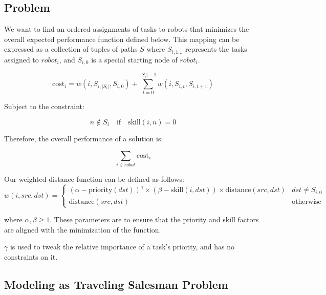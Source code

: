 \documentclass[a4paper]{article}
\begin{document}
\subsection{Problem}

We want to find an ordered assignments of tasks to robots that minimizes the overall expected performance function defined below. This mapping can be expressed as a collection of tuples of paths $S$ where $S_{i,1\dots}$ represents the tasks assigned to $\mathit{robot}_i$, and $S_{i,0}$ is a special starting node of $\mathit{robot}_i$.

$$
\text{cost}_i = w(i, S_{i,|S_i|}, S_{i,0}) + \sum_{t = 0}^{|S_i|-1} w(i, S_{i,t}, S_{i,t+1})
$$

Subject to the constraint:

$$
n \notin S_i \quad \text{if} \quad \text{skill}(i, n) = 0
$$

Therefore, the overall performance of a solution is:

$$
\sum_{i \in \mathit{robot}} \text{cost}_i
$$

Our weighted-distance function can be defined as follows:
$$
w(i, \mathit{src}, \mathit{dst}) = \begin{cases}
(\alpha - \text{priority}(\mathit{dst}))^\gamma \times (\beta - \text{skill}(i, \mathit{dst})) \times \text{distance}(\mathit{src}, \mathit{dst}) & \mathit{dst} \ne S_{i,0} \\
\text{distance}(\mathit{src}, \mathit{dst}) & \text{otherwise}
\end{cases}
$$

where $\alpha, \beta \geq 1$. These parameters are to ensure that the priority and skill factors are aligned with the minimization of the function.

$\gamma$ is used to tweak the relative importance of a task's priority, and has no constraints on it.


\subsection{Modeling as Traveling Salesman Problem}

\end{document}
